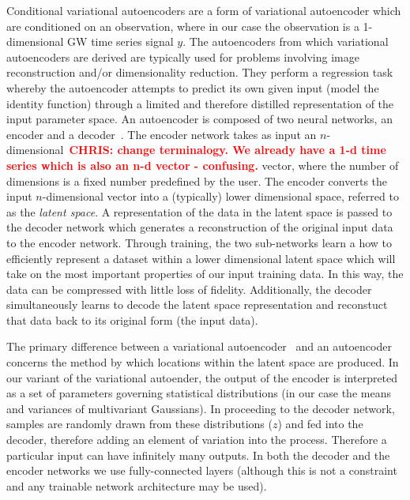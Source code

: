 \documentclass[%
showpacs,
 amsmath,amssymb,
 aps,
 twocolumn,
 prl,
 reprint,
floatfix,
]{revtex4-1}
\newcommand{\chris}[1]{\textbf{\textcolor{red}{CHRIS: #1}}}
\begin{document}
%
%
Conditional variational autoencoders are a form of variational autoencoder
which are conditioned on an observation, where in our case the observation is a
1-dimensional \ac{GW} time series signal $y$. The autoencoders from which
variational autoencoders are derived are typically used for problems involving
image reconstruction and/or dimensionality reduction. They perform a regression
task whereby the autoencoder attempts to predict its own given input (model the
identity function) through a limited and therefore distilled representation of
the input parameter space. An autoencoder is composed of two neural networks,
an encoder and a decoder~\cite{LIOU20083150}. The encoder network takes as
input an $n$-dimensional~\chris{change terminalogy. We already have a 1-d time
series which is also an n-d vector - confusing.} vector, where the number of
dimensions is a fixed number predefined by the user. The encoder converts the
input $n$-dimensional vector into a (typically) lower dimensional space,
referred to as the {\it{latent space}}. A representation of the data in the
latent space is passed to the decoder network which generates a reconstruction
of the original input data to the encoder network. Through training, the two
sub-networks learn a how to efficiently represent a dataset within a lower
dimensional latent space which will take on the most important properties of
our input training data. In this way, the data can be compressed with little
loss of fidelity. Additionally, the decoder simultaneously learns to decode the
latent space representation and reconstuct that data back to its original form
(the input data). 

%
%
The primary difference between a variational autoencoder~\cite{1812.04405} and
an autoencoder concerns the method by which locations within the latent space
are produced. In our variant of the variational autoender, the output of the
encoder is interpreted as a set of parameters governing statistical
distributions (in our case the means and variances of multivariant Gaussians).
In proceeding to the decoder network, samples are randomly drawn from these
distributions ($z$) and fed into the decoder, therefore adding an element of
variation into the process. Therefore a particular input can have infinitely
many outputs. In both the decoder and the encoder networks we use
fully-connected layers (although this is not a constraint and any trainable
network architecture may be used).
\end{document}
